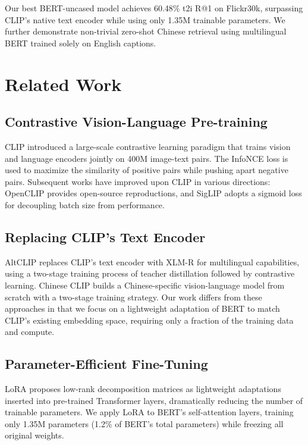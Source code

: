 \documentclass[10pt,leqno]{amsart}
\begin{document}
Our best BERT-uncased model achieves 60.48\% t2i R@1 on Flickr30k, surpassing CLIP's native text encoder while using only 1.35M trainable parameters. We further demonstrate non-trivial zero-shot Chinese retrieval using multilingual BERT trained solely on English captions.

\section{Related Work}

\subsection{Contrastive Vision-Language Pre-training}

CLIP \citep{radford2021clip} introduced a large-scale contrastive learning paradigm that trains vision and language encoders jointly on 400M image-text pairs. The InfoNCE loss \citep{oord2018representation} is used to maximize the similarity of positive pairs while pushing apart negative pairs. Subsequent works have improved upon CLIP in various directions: OpenCLIP provides open-source reproductions, and SigLIP \citep{zhai2023sigmoid} adopts a sigmoid loss for decoupling batch size from performance.

\subsection{Replacing CLIP's Text Encoder}

AltCLIP \citep{chen2022altclip} replaces CLIP's text encoder with XLM-R \citep{conneau2020xlmr} for multilingual capabilities, using a two-stage training process of teacher distillation followed by contrastive learning. Chinese CLIP \citep{yang2022chinese} builds a Chinese-specific vision-language model from scratch with a two-stage training strategy. Our work differs from these approaches in that we focus on a lightweight adaptation of BERT \citep{devlin2019bert} to match CLIP's existing embedding space, requiring only a fraction of the training data and compute.

\subsection{Parameter-Efficient Fine-Tuning}

LoRA \citep{hu2022lora} proposes low-rank decomposition matrices as lightweight adaptations inserted into pre-trained Transformer layers, dramatically reducing the number of trainable parameters. We apply LoRA to BERT's self-attention layers, training only 1.35M parameters (1.2\% of BERT's total parameters) while freezing all original weights.
\end{document}

